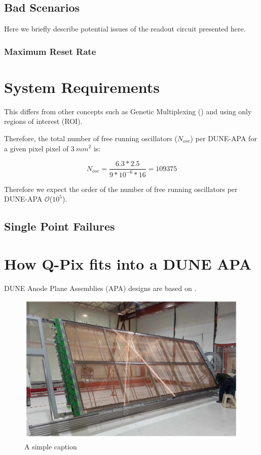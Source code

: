\subsection{Bad Scenarios}

Here we briefly describe potential issues of the readout circuit presented here.

\subsubsection{Maximum Reset Rate}



\section{System Requirements}

This differs from other concepts such as Genetic Multiplexing (\citep{PROCUREUR2013888_genetic_multiplexing}) and using only regions of interest (ROI).

Therefore, the total number of free running oscillators ($N_{osc}$) per DUNE-APA for a given pixel pixel of $3~mm^{2}$ is:

\begin{equation}
N_{osc} = \frac{6.3 * 2.5}{9*10^{-6}*16} = 109375
\end{equation}

Therefore we expect the order of the number of free running oscillators per DUNE-APA $\mathcal{O}$($10^5$).

\subsection{Single Point Failures}

\section{How Q-Pix fits into a DUNE APA}

DUNE Anode Plane Assemblies (APA) designs are based on \citep{DUNE-FD_TDRv4:Abi_2020}.

\begin{figure}[]
\centering
\includegraphics[width=\textwidth]{images/dune_fd_tdr_apa_image.jpg}
\caption{A simple caption \citep{DUNE-FD_TDRv4:Abi_2020}}
\end{figure}
